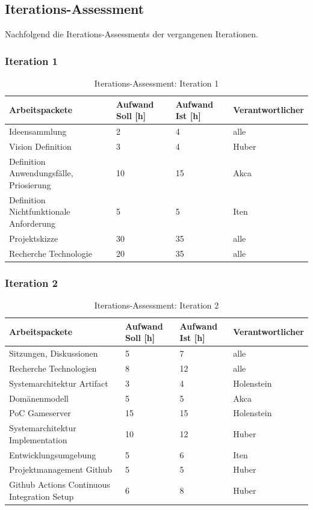 \documentclass[11pt,ngerman]{article}
\begin{document}
    \subsection{Iterations-Assessment}
    Nachfolgend die Iterations-Assessments der vergangenen Iterationen.

    \subsubsection{Iteration 1}
    \begin{table}[H]
        \caption{Iterations-Assessment: Iteration 1}
        \begin{tabularx}{\textwidth}{l l l l}
            \toprule
            Arbeitspackete & Aufwand Soll [h] & Aufwand Ist [h] & Verantwortlicher \\
            \toprule
            Ideensammlung & 2 & 4 & alle \\
            Vision Definition & 3 & 4 & Huber \\
            Definition Anwendungsfälle, Priosierung & 10 & 15 & Akca \\
            Definition Nichtfunktionale Anforderung & 5 & 5 & Iten \\
            Projektskizze & 30 & 35 & alle \\
            Recherche Technologie & 20 & 35 & alle \\
            \bottomrule
        \end{tabularx}
        \label{tab:Iterations-Assessment: Iteration 1}
    \end{table}

    \subsubsection{Iteration 2}
    \begin{table}[H]
        \caption{Iterations-Assessment: Iteration 2}
        \begin{tabularx}{\textwidth}{l l l l}
            \toprule
            Arbeitspackete & Aufwand Soll [h] & Aufwand Ist [h] & Verantwortlicher \\
            \toprule
            Sitzungen, Diskussionen & 5 & 7 & alle \\
            Recherche Technologien & 8 & 12 & alle \\
            Systemarchitektur Artifact & 3 & 4 & Holenstein \\
            Domänenmodell & 5 & 5 & Akca \\
            PoC Gameserver & 15 & 15 & Holenstein \\
            Systemarchitektur Implementation & 10 & 12 & Huber \\
            Entwicklungsumgebung & 5 & 6 & Iten \\
            Projektmanagement Github & 5 & 5 & Huber \\
            Github Actions Continuous Integration Setup & 6 & 8 & Huber \\
            \bottomrule
        \end{tabularx}
        \label{tab:Iterations-Assessment: Iteration 2}
    \end{table}
\end{document}
